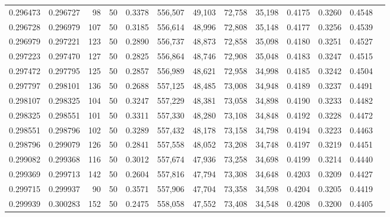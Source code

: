 \begin{tabular}{rrrrrrrrrrrrr}
0.296473 & 0.296727 &    98 &  50 &                                     0.3378 & 556,507 &  49,103 &  72,758 &  35,198 & 0.4175 & 0.3260 & 0.4548 \\
0.296728 & 0.296979 &   107 &  50 &                                     0.3185 & 556,614 &  48,996 &  72,808 &  35,148 & 0.4177 & 0.3256 & 0.4539 \\
0.296979 & 0.297221 &   123 &  50 &                                     0.2890 & 556,737 &  48,873 &  72,858 &  35,098 & 0.4180 & 0.3251 & 0.4527 \\
0.297223 & 0.297470 &   127 &  50 &                                     0.2825 & 556,864 &  48,746 &  72,908 &  35,048 & 0.4183 & 0.3247 & 0.4515 \\
0.297472 & 0.297795 &   125 &  50 &                                     0.2857 & 556,989 &  48,621 &  72,958 &  34,998 & 0.4185 & 0.3242 & 0.4504 \\
0.297797 & 0.298101 &   136 &  50 &                                     0.2688 & 557,125 &  48,485 &  73,008 &  34,948 & 0.4189 & 0.3237 & 0.4491 \\
0.298107 & 0.298325 &   104 &  50 &                                     0.3247 & 557,229 &  48,381 &  73,058 &  34,898 & 0.4190 & 0.3233 & 0.4482 \\
0.298325 & 0.298551 &   101 &  50 &                                     0.3311 & 557,330 &  48,280 &  73,108 &  34,848 & 0.4192 & 0.3228 & 0.4472 \\
0.298551 & 0.298796 &   102 &  50 &                                     0.3289 & 557,432 &  48,178 &  73,158 &  34,798 & 0.4194 & 0.3223 & 0.4463 \\
0.298796 & 0.299079 &   126 &  50 &                                     0.2841 & 557,558 &  48,052 &  73,208 &  34,748 & 0.4197 & 0.3219 & 0.4451 \\
0.299082 & 0.299368 &   116 &  50 &                                     0.3012 & 557,674 &  47,936 &  73,258 &  34,698 & 0.4199 & 0.3214 & 0.4440 \\
0.299369 & 0.299713 &   142 &  50 &                                     0.2604 & 557,816 &  47,794 &  73,308 &  34,648 & 0.4203 & 0.3209 & 0.4427 \\
0.299715 & 0.299937 &    90 &  50 &                                     0.3571 & 557,906 &  47,704 &  73,358 &  34,598 & 0.4204 & 0.3205 & 0.4419 \\
0.299939 & 0.300283 &   152 &  50 &                                     0.2475 & 558,058 &  47,552 &  73,408 &  34,548 & 0.4208 & 0.3200 & 0.4405 \\

\end{tabular}
